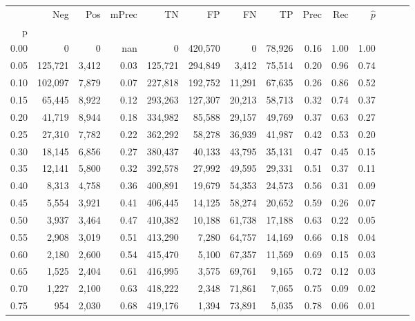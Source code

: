 \begin{tabular}{rrrrrrrrrrrrrr}
\toprule
{} &      Neg &    Pos & mPrec &       TN &       FP &      FN &      TP &  Prec &   Rec & $\hat{p}$ \\
p    &          &        &       &          &          &         &         &       &       &           \\
\midrule
0.00 &        0 &      0 &   nan &        0 &  420,570 &       0 &  78,926 &  0.16 &  1.00 &      1.00 \\
0.05 &  125,721 &  3,412 &  0.03 &  125,721 &  294,849 &   3,412 &  75,514 &  0.20 &  0.96 &      0.74 \\
0.10 &  102,097 &  7,879 &  0.07 &  227,818 &  192,752 &  11,291 &  67,635 &  0.26 &  0.86 &      0.52 \\
0.15 &   65,445 &  8,922 &  0.12 &  293,263 &  127,307 &  20,213 &  58,713 &  0.32 &  0.74 &      0.37 \\
0.20 &   41,719 &  8,944 &  0.18 &  334,982 &   85,588 &  29,157 &  49,769 &  0.37 &  0.63 &      0.27 \\
0.25 &   27,310 &  7,782 &  0.22 &  362,292 &   58,278 &  36,939 &  41,987 &  0.42 &  0.53 &      0.20 \\
0.30 &   18,145 &  6,856 &  0.27 &  380,437 &   40,133 &  43,795 &  35,131 &  0.47 &  0.45 &      0.15 \\
0.35 &   12,141 &  5,800 &  0.32 &  392,578 &   27,992 &  49,595 &  29,331 &  0.51 &  0.37 &      0.11 \\
0.40 &    8,313 &  4,758 &  0.36 &  400,891 &   19,679 &  54,353 &  24,573 &  0.56 &  0.31 &      0.09 \\
0.45 &    5,554 &  3,921 &  0.41 &  406,445 &   14,125 &  58,274 &  20,652 &  0.59 &  0.26 &      0.07 \\
0.50 &    3,937 &  3,464 &  0.47 &  410,382 &   10,188 &  61,738 &  17,188 &  0.63 &  0.22 &      0.05 \\
0.55 &    2,908 &  3,019 &  0.51 &  413,290 &    7,280 &  64,757 &  14,169 &  0.66 &  0.18 &      0.04 \\
0.60 &    2,180 &  2,600 &  0.54 &  415,470 &    5,100 &  67,357 &  11,569 &  0.69 &  0.15 &      0.03 \\
0.65 &    1,525 &  2,404 &  0.61 &  416,995 &    3,575 &  69,761 &   9,165 &  0.72 &  0.12 &      0.03 \\
0.70 &    1,227 &  2,100 &  0.63 &  418,222 &    2,348 &  71,861 &   7,065 &  0.75 &  0.09 &      0.02 \\
0.75 &      954 &  2,030 &  0.68 &  419,176 &    1,394 &  73,891 &   5,035 &  0.78 &  0.06 &      0.01 \\

\end{tabular}

